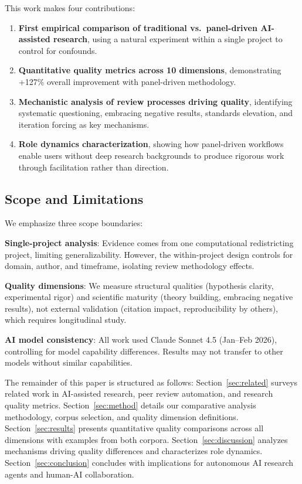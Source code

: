 This work makes four contributions:

\begin{enumerate}[leftmargin=*]
\item \textbf{First empirical comparison of traditional vs.\ panel-driven AI-assisted research}, using a natural experiment within a single project to control for confounds.

\item \textbf{Quantitative quality metrics across 10 dimensions}, demonstrating +127\% overall improvement with panel-driven methodology.

\item \textbf{Mechanistic analysis of review processes driving quality}, identifying systematic questioning, embracing negative results, standards elevation, and iteration forcing as key mechanisms.

\item \textbf{Role dynamics characterization}, showing how panel-driven workflows enable users without deep research backgrounds to produce rigorous work through facilitation rather than direction.
\end{enumerate}

\subsection{Scope and Limitations}

We emphasize three scope boundaries:

\textbf{Single-project analysis}: Evidence comes from one computational redistricting project, limiting generalizability. However, the within-project design controls for domain, author, and timeframe, isolating review methodology effects.

\textbf{Quality dimensions}: We measure structural qualities (hypothesis clarity, experimental rigor) and scientific maturity (theory building, embracing negative results), not external validation (citation impact, reproducibility by others), which requires longitudinal study.

\textbf{AI model consistency}: All work used Claude Sonnet 4.5 (Jan--Feb 2026), controlling for model capability differences. Results may not transfer to other models without similar capabilities.

The remainder of this paper is structured as follows: Section~\ref{sec:related} surveys related work in AI-assisted research, peer review automation, and research quality metrics. Section~\ref{sec:method} details our comparative analysis methodology, corpus selection, and quality dimension definitions. Section~\ref{sec:results} presents quantitative quality comparisons across all dimensions with examples from both corpora. Section~\ref{sec:discussion} analyzes mechanisms driving quality differences and characterizes role dynamics. Section~\ref{sec:conclusion} concludes with implications for autonomous AI research agents and human-AI collaboration.
